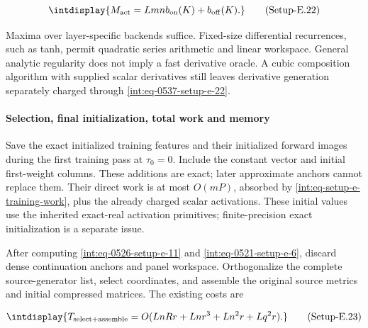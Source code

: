 \label{int:eq-setup-e-22}
\begingroup\renewcommand{\theHequation}{intdisplay.1027}
\begin{equation}
\intdisplay{
M_{\rm act}=Lmn b_{\rm on}(K)+b_{\rm off}(K).
}
\tag{Setup-E.22}
\label{int:eq-0537-setup-e-22}
\end{equation}
\endgroup


Maxima over layer-specific backends suffice. Fixed-size differential recurrences, such as tanh, permit quadratic series arithmetic and linear workspace. General analytic regularity does not imply a fast derivative oracle. A cubic composition algorithm with supplied scalar derivatives still leaves derivative generation separately charged through \hyperref[int:eq-setup-e-22]{\eqref{int:eq-0537-setup-e-22}}.


\paragraph{Selection, final initialization, total work and memory}
\label{int:setup-assembly-5}
\mbox{}\par\smallskip


Save the exact initialized training features and their initialized forward images during the first training pass at \(\tau_0=0\). Include the constant vector and initial first-weight columns. These additions are exact; later approximate anchors cannot replace them. Their direct work is at most \(O(mP)\), absorbed by \eqref{int:eq-setup-e-training-work}, plus the already charged scalar activations. These initial values use the inherited exact-real activation primitives; finite-precision exact initialization is a separate issue.



After computing \hyperref[int:eq-setup-e-11]{\eqref{int:eq-0526-setup-e-11}} and \hyperref[int:eq-setup-e-6]{\eqref{int:eq-0521-setup-e-6}}, discard dense continuation anchors and panel workspace. Orthogonalize the complete source-generator list, select coordinates, and assemble the original source metrics and initial compressed matrices. The existing costs are


\label{int:eq-setup-e-23}
\begingroup\renewcommand{\theHequation}{intdisplay.1028}
\begin{equation}
\intdisplay{
T_{\rm select+assemble}
=O(LnRr+Lnr^3+Ln^2r+Lq^2r).
}
\tag{Setup-E.23}
\label{int:eq-0538-setup-e-23}
\end{equation}
\endgroup

